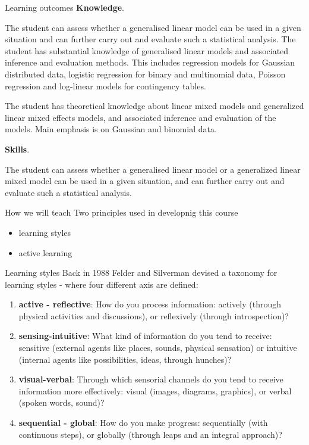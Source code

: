 \documentclass[
  ignorenonframetext,
]{beamer}
\providecommand{\tightlist}{%
  \setlength{\itemsep}{0pt}\setlength{\parskip}{0pt}}
\begin{document}
\begin{frame}{Learning outcomes}
\protect\hypertarget{learning-outcomes}{}
\textbf{Knowledge}.

The student can assess whether a generalised linear model can be used in
a given situation and can further carry out and evaluate such a
statistical analysis. The student has substantial knowledge of
generalised linear models and associated inference and evaluation
methods. This includes regression models for Gaussian distributed data,
logistic regression for binary and multinomial data, Poisson regression
and log-linear models for contingency tables.

The student has theoretical knowledge about linear mixed models and
generalized linear mixed effects models, and associated inference and
evaluation of the models. Main emphasis is on Gaussian and binomial
data.

\textbf{Skills}.

The student can assess whether a generalised linear model or a
generalized linear mixed model can be used in a given situation, and can
further carry out and evaluate such a statistical analysis.
\end{frame}

\begin{frame}{How we will teach}
\protect\hypertarget{how-we-will-teach}{}
Two principles used in developnig this course

\begin{itemize}
\tightlist
\item
  learning styles
\item
  active learning
\end{itemize}
\end{frame}

\begin{frame}{Learning styles}
\protect\hypertarget{learning-styles}{}
Back in 1988 Felder and Silverman devised a taxonomy for learning styles
- where four different axis are defined:

\begin{enumerate}
[1)]
\tightlist
\item
  \textbf{active - reflective}: How do you process information: actively
  (through physical activities and discussions), or reflexively (through
  introspection)?
\item
  \textbf{sensing-intuitive}: What kind of information do you tend to
  receive: sensitive (external agents like places, sounds, physical
  sensation) or intuitive (internal agents like possibilities, ideas,
  through hunches)?
\item
  \textbf{visual-verbal}: Through which sensorial channels do you tend
  to receive information more effectively: visual (images, diagrams,
  graphics), or verbal (spoken words, sound)?
\item
  \textbf{sequential - global}: How do you make progress: sequentially
  (with continuous steps), or globally (through leaps and an integral
  approach)?
\end{enumerate}
\end{frame}
\end{document}
